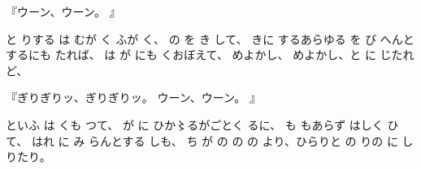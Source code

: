 『ウーン、ウーン。
』

と
りする
は
むが
く
ふが
く、
の
を
き
して、
きに
するあらゆる
を
び
へんとするにも
たれば、
は
が
にも
くおぼえて、
めよかし、
めよかし、と
に
じたれど、

『ぎりぎりッ、ぎりぎりッ。
ウーン、ウーン。
』

といふ
は
くも
つて、
が
に
ひか〻るがごとく
るに、
も
もあらず
はしく
ひて、
はれ
に
み
らんとする
しも、
ち
が
の
の
の
より、ひらりと
の
りの
に
し
りたり。

